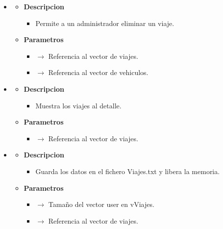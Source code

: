 \begin{itemize}
\begin{itemize}
	\end{itemize}
    \item \label{def:editviadmin}
    \begin{itemize}
        \item \textbf{Descripcion}
        \begin{itemize}
			\item Permite a un administrador eliminar un viaje.
		\end{itemize}
		\item \textbf{Parametros}
		\begin{itemize}
			\item {}  $\rightarrow$ Referencia al vector de viajes.
            \item {} $\rightarrow$ Referencia al vector de vehiculos.
		\end{itemize}
	\end{itemize}
    \item \label{def:listviadmin}
    \begin{itemize}
        \item \textbf{Descripcion}
        \begin{itemize}
			\item  Muestra los viajes al detalle.
		\end{itemize}
		\item \textbf{Parametros}
		\begin{itemize}
			\item {}  $\rightarrow$ Referencia al vector de viajes.
		\end{itemize}
	\end{itemize}
    \item \label{def:savevi}
    \begin{itemize}
        \item \textbf{Descripcion}
        \begin{itemize}
			\item  Guarda los datos en el fichero Viajes.txt y libera la memoria.
		\end{itemize}
		\item \textbf{Parametros}
		\begin{itemize}
            \item {} $\rightarrow$ Tamaño del vector user en vViajes.
			\item {} $\rightarrow$ Referencia al vector de viajes.

\end{itemize}
\end{itemize}
\end{itemize}
